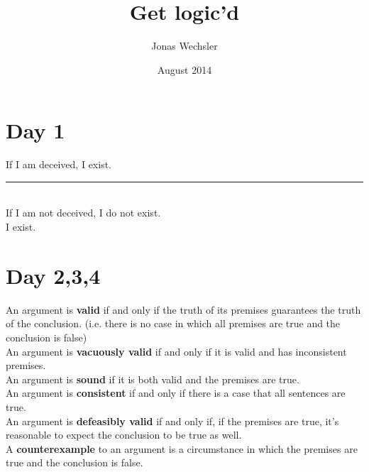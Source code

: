 \documentclass{article}
\title{Get logic'd}
\author{Jonas Wechsler}
\date{August 2014}
\newcommand{\thf}{\rule{\textwidth}{.4pt}}
\begin{document}
\maketitle

\section{Day 1}
If I am deceived, I exist.
\\ \thf \\
If I am not deceived, I do not exist.
\\ I exist.
\section{Day 2,3,4}
An argument is \textbf{valid} if and only if the truth of its premises guarantees the truth of the conclusion. (i.e. there is no case in which all premises are true and the conclusion is false)
\\An argument is \textbf{vacuously valid} if and only if it is valid and has inconsistent premises.
\\An argument is \textbf{sound} if it is both valid and the premises are true.
\\An argument is \textbf{consistent} if and only if there is a case that all sentences are true.
\\An argument is \textbf{defeasibly valid} if and only if, if the premises are true, it's reasonable to expect the conclusion to be true as well.
\\A \textbf{counterexample} to an argument is a circumstance in which the premises are true and the conclusion is false.
\end{document}
